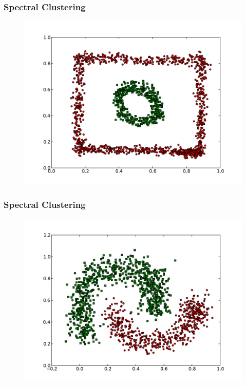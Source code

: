 \documentclass{beamer}
\begin{document}
\begin{frame}
\frametitle{Spectral Clustering}
    \begin{figure}[]
    \includegraphics[scale=0.5]{spectral_circle-weird.pdf}
    \end{figure}
\end{frame}

\begin{frame}
\frametitle{Spectral Clustering}
    \begin{figure}[]
    \includegraphics[scale=0.5]{spectral_half-moons.pdf}
    \end{figure}
\end{frame}
\end{document}
